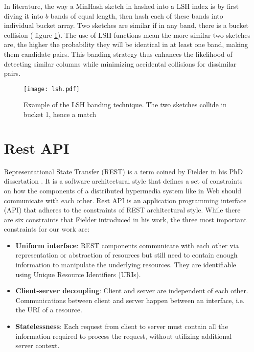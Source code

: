 In literature, the way a MinHash sketch in hashed into a LSH index is by first diving it into \(b\) bands of equal length, then hash each of these bands into individual bucket array. Two sketches are similar if in any band, there is a bucket collision ( figure \ref{fig:lsh}). The use of LSH functions mean the more similar two sketches are, the higher the probability they will be identical in at least one band, making them candidate pairs. This banding strategy thus enhances the likelihood of detecting similar columns while minimizing accidental collisions for dissimilar pairs.

\begin{figure}[h]
\texttt{[image: lsh.pdf]}
\centering
\caption{Example of the LSH banding technique. The two sketches collide in bucket 1, hence a match}
\label{fig:lsh}
\end{figure}

\section{Rest API}

Representational State Transfer (REST) is a term coined by Fielder in his PhD dissertation \cite{rest}. It is a software architectural style that defines a set of constraints on how the components of a distributed hypermedia system like in Web should communicate with each other. Rest API is an application programming interface (API) that adheres to the constraints of REST architectural style. While there are six constraints that Fielder introduced in his work, the three most important constraints for our work are:

\begin{itemize}
    \item \textbf{Uniform interface}: REST components communicate with each other via representation or abstraction of resources but still need to contain enough information to manipulate the underlying resources. They are identifiable using Unique Resource Identifiers (URIs).
    \item \textbf{Client-server decoupling}: Client and server are independent of each other. Communications between client and server happen between an interface, i.e. the URI of a resource.
    \item \textbf{Statelessness}: Each request from client to server must contain all the information required to process the request, without utilizing additional server context.
\end{itemize}


